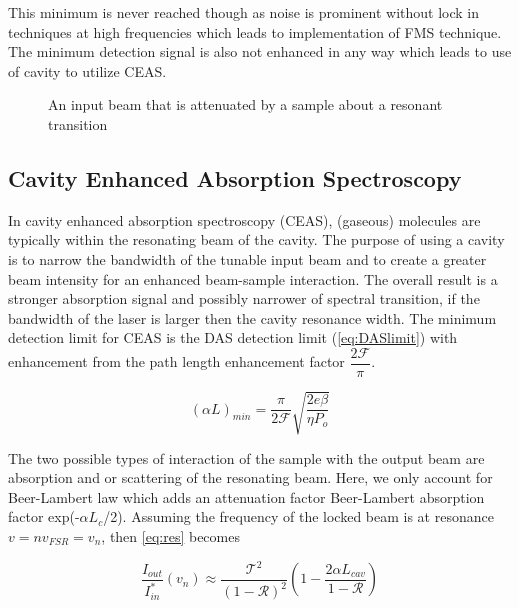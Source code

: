 \documentclass[11pt,a4paper]{book}
\newcommand{\imginput}[1]{} %
\begin{document}
			This minimum is never reached though as noise is prominent without lock in techniques at high frequencies which leads to implementation of FMS technique. The minimum detection signal is also not enhanced in any way which leads to use of cavity to utilize CEAS. 
			
			\begin{figure} [!ht]
				\centering
				\def\svgwidth{\columnwidth}
				\resizebox{150mm}{!}{\imginput{images/dir-abs-spec.pdf_tex}}
				\label{fig:dir-abs-spec}
				\caption{An input beam that is attenuated by a sample about a resonant transition}
			\end{figure}		

		\subsection{Cavity Enhanced Absorption Spectroscopy}
			\label{subsec:Cavity Enhanced Absorption Spectroscopy}
			In cavity enhanced absorption spectroscopy (CEAS), (gaseous) molecules are typically within the resonating beam of the cavity.
			The purpose of using a cavity is to narrow the bandwidth of the tunable input beam and to create a greater beam intensity for an enhanced beam-sample interaction. The overall result is a stronger absorption signal and possibly narrower of spectral transition, if the bandwidth of the laser is larger then the cavity resonance width. The minimum detection limit for CEAS is the DAS detection limit (\autoref{eq:DASlimit}) with enhancement from the path length enhancement factor $\dfrac{2\mathcal{F}}{\pi}$.
			
			\begin{equation}
			\label{eq:CEASlimit}
			(\alpha L)_{min}=\dfrac{\pi}{2\mathcal{F}}\sqrt{\dfrac{2e\beta}{\eta P_o}}
			\end{equation}
			
			The two possible types of interaction of the sample with the output beam are absorption and or scattering of the resonating beam. Here, we only account for Beer-Lambert law which adds an attenuation factor Beer-Lambert absorption factor exp(-$\alpha L_c$/2).
			Assuming the frequency of the locked beam is at resonance $v=nv_{FSR}=v_n$, then \eqref{eq:res} becomes 
			
			\begin{equation} \label{eq:CEAS}
			\dfrac{I_{out}}{I_{in}^*}(v_n) \approx \dfrac{\mathcal{T}^2 }{({1-\mathcal{R}})^2}  \left(1- \dfrac{2\alpha L_{cav}}{1-\mathcal{R}}\right)
			\end{equation}
			
\end{document}
